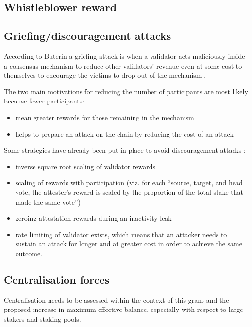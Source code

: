 \documentclass[UTF8]{article}
\begin{document}


\subsection{Whistleblower reward}





\subsection{Griefing/discouragement attacks}
According to Buterin a griefing attack is when a validator acts maliciously inside a consensus mechanism to reduce other validators' revenue even at some cost to themselves to encourage the victims to drop out of the mechanism \cite{buterin2018c}.

The two main motivations for reducing the number of participants are most likely because fewer participants:
\begin{itemize}
\item mean greater rewards for those remaining in the mechanism
\item helps to prepare an attack on the chain by reducing the cost of an attack
\end{itemize}

Some strategies have already been put in place to avoid discouragement attacks \cite{Edgington2023}:
\begin{itemize}
\item inverse square root scaling of validator rewards
\item scaling of rewards with participation (viz. for each ``source, target, and head vote, the attester's reward is scaled by the proportion of the total stake that made the same vote'')
\item zeroing attestation rewards during an inactivity leak
\item rate limiting of validator exists, which means that an attacker needs to sustain an attack for longer and at greater cost in order to achieve the same outcome.
\end{itemize}

\subsection{Centralisation forces}
Centralisation needs to be assessed within the context of this grant and the proposed increase in maximum effective balance, especially with respect to large stakers and staking pools.
\end{document}
